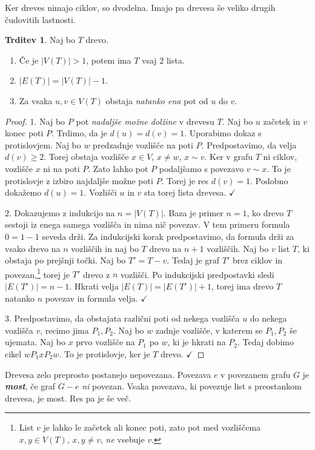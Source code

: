 \documentclass[11pt]{book}
\def\definicija{\color{rdeca}\bf\em}
\def\kljuka{$\checkmark$}
\theoremstyle{definition}
\theoremstyle{zgled}
\theoremstyle{odprtproblem}
\theoremstyle{domacanaloga}
\newenvironment{dokaz}
    {\color{siva}\begin{proof}}
    {\end{proof}}
\theoremstyle{izrek}
\newtheorem*{trditev}{Trditev}
\begin{document}
Ker dreves nimajo ciklov, so dvodelna. Imajo pa drevesa še veliko drugih čudovitih lastnosti.

\begin{trditev}
    Naj bo $T$ drevo.
    \begin{enumerate}
        \item Če je $|V(T)| > 1$, potem ima $T$ vsaj $2$ lista.
        \item $|E(T)| = |V(T)| - 1$.
        \item Za vsaka $u,v \in V(T)$ obstaja \emph{natanko ena} pot od $u$ do $v$.
    \end{enumerate}
\end{trditev}
\begin{dokaz}
1. Naj bo $P$ pot \emph{nadaljše možne dolžine} v drevesu $T$. Naj bo $u$ začetek in $v$ konec poti $P$. Trdimo, da je $d(u) = d(v) = 1$. Uporabimo dokaz s protislovjem. Naj bo $w$ predzadnje vozlišče na poti $P$. Predpostavimo, da velja $d(v) \geq 2$. Torej obstaja vozlišče $x \in V$, $x \neq w$, $x \sim v$. Ker v grafu $T$ ni ciklov, vozlišče $x$ ni na poti $P$. Zato lahko pot $P$ podaljšamo s povezavo $v \sim x$. To je protislovje z izbiro najdaljše možne poti $P$. Torej je res $d(v) = 1$. Podobno dokažemo $d(u) = 1$. Vozlišči $u$ in $v$ sta torej lista drevesa. \kljuka

2. Dokazujemo z indukcijo na $n = |V(T)|$. Baza je primer $n = 1$, ko drevo $T$ sestoji iz enega samega vozlišča in nima nič povezav. V tem primeru formula $0 = 1 - 1$ seveda drži. Za indukcijski korak predpostavimo, da formula drži za vsako drevo na $n$ vozliščih in naj bo $T$ drevo na $n+1$ vozliščih. Naj bo $v$ list $T$, ki obstaja po prejšnji točki. Naj bo $T' = T - v$. Tedaj je graf $T'$ brez ciklov in povezan,\footnote{List $v$ je lahko le začetek ali konec poti, zato pot med vozliščema $x,y \in V(T)$, $x,y \neq v$, \emph{ne} vsebuje $v$.} torej je $T'$ drevo z $n$ vozlišči. Po indukcijski predpostavki sledi $|E(T')| = n - 1$. Hkrati velja $|E(T)| = |E(T')| + 1$, torej ima drevo $T$ natanko $n$ povezav in formula velja. \kljuka

3. Predpostavimo, da obstajata različni poti od nekega vozlišča $u$ do nekega vozlišča $v$, recimo jima $P_1, P_2$. Naj bo $w$ zadnje vozlišče, v katerem se $P_1, P_2$ še ujemata. Naj bo $x$ prvo vozlišče na $P_1$ po $w$, ki je hkrati na $P_2$. Tedaj dobimo cikel $wP_1xP_2w$. To je protislovje, ker je $T$ drevo. \kljuka
\end{dokaz}

Drevesa zelo preprosto postanejo nepovezana. Povezava $e$ v povezanem grafu $G$ je {\definicija most}, če graf $G - e$ \emph{ni} povezan. Vsaka povezava, ki povezuje list s preostankom drevesa, je most. Res pa je še več.
\end{document}
